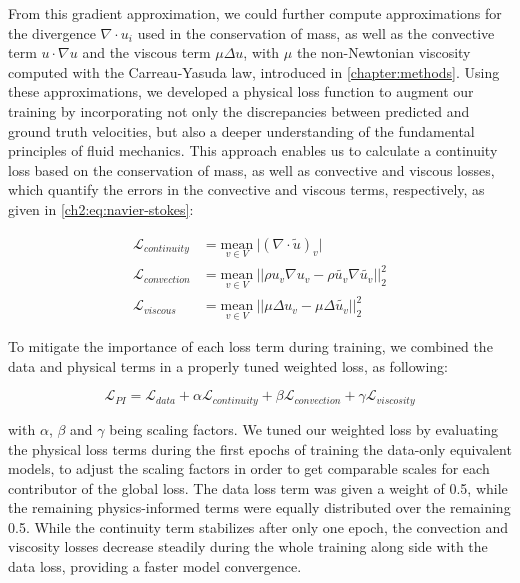From this gradient approximation, we could further compute approximations for the divergence $\nabla \cdot u_i$ used in the conservation of mass, as well as the convective term $u \cdot \nabla u$ and the viscous term $\mu \Delta u$, with $\mu$ the non-Newtonian viscosity computed with the Carreau-Yasuda law, introduced in \autoref{chapter:methods}. Using these approximations, we developed a physical loss function to augment our training by incorporating not only the discrepancies between predicted and ground truth velocities, but also a deeper understanding of the fundamental principles of fluid mechanics. This approach enables us to calculate a continuity loss based on the conservation of mass, as well as convective and viscous losses, which quantify the errors in the convective and viscous terms, respectively, as given in \autoref{ch2:eq:navier-stokes}: 


\begin{align} \label{eq:loss_phy}
    \mathcal{L}_{continuity} &= \underset{v \in V}{\mathrm{mean}} \ \vert  (\nabla \cdot \tilde{u})_v \vert \\
    \mathcal{L}_{convection} &= \underset{v \in V}{\mathrm{mean}} \ \vert \vert \rho u_v \nabla u_v - \rho \tilde{u_v} \nabla \tilde{u_v} \vert \vert^2_2 \\
    \mathcal{L}_{viscous} &= \underset{v \in V}{\mathrm{mean}} \ \vert \vert \mu \Delta u_v - \mu \Delta \tilde{u_v} \vert \vert^2_2
\end{align}

To mitigate the importance of each loss term during training, we combined the data and physical terms in a properly tuned weighted loss, as following: 

\begin{equation}
    \mathcal{L}_{PI} = \mathcal{L}_{data} + \alpha \mathcal{L}_{continuity} + \beta \mathcal{L}_{convection} + \gamma \mathcal{L}_{viscosity}
\end{equation}

with $\alpha$, $\beta$ and $\gamma$ being scaling factors. We tuned our weighted loss by evaluating the physical loss terms during the first epochs of training the data-only equivalent models, to adjust the scaling factors in order to get comparable scales for each contributor of the global loss. The data loss term was given a weight of 0.5, while the remaining physics-informed terms were equally distributed over the remaining 0.5. While the continuity term stabilizes after only one epoch, the convection and viscosity losses decrease steadily during the whole training along side with the data loss, providing a faster model convergence.


